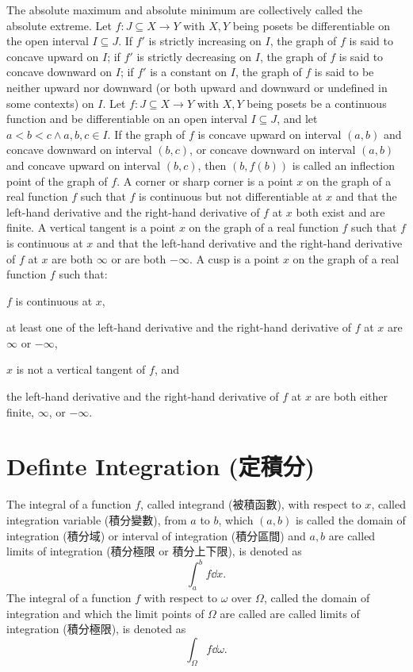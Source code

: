 \documentclass[a4paper,12pt]{report}
\begin{document}
The absolute maximum and absolute minimum are collectively called the absolute extreme.
Let $f\colon J\subseteq X\to Y$ with $X,Y$ being posets be differentiable on the open interval $I\subseteq J$. If $f'$ is strictly increasing on $I$, the graph of $f$ is said to concave upward on $I$; if $f'$ is strictly decreasing on $I$, the graph of $f$ is said to concave downward on $I$; if $f'$ is a constant on $I$, the graph of $f$ is said to be neither upward nor downward (or both upward and downward or undefined in some contexts) on $I$.
Let $f\colon J\subseteq X\to Y$ with $X,Y$ being posets be a continuous function and be differentiable on an open interval $I\subseteq J$, and let $a<b<c\land a,b,c\in I$. If the graph of $f$ is concave upward on interval $(a,b)$ and concave downward on interval $(b,c)$, or concave downward on interval $(a,b)$ and concave upward on interval $(b,c)$, then $(b,f(b))$ is called an inflection point of the graph of $f$.
A corner or sharp corner is a point $x$ on the graph of a real function $f$ such that $f$ is continuous but not differentiable at $x$ and that the left-hand derivative and the right-hand derivative of $f$ at $x$ both exist and are finite.
A vertical tangent is a point $x$ on the graph of a real function $f$ such that $f$ is continuous at $x$ and that the left-hand derivative and the right-hand derivative of $f$ at $x$ are both $\infty$ or are both $-\infty$.
A cusp is a point $x$ on the graph of a real function $f$ such that:
\bit
\item $f$ is continuous at $x$,
\item at least one of the left-hand derivative and the right-hand derivative of $f$ at $x$ are $\infty$ or $-\infty$,
\item $x$ is not a vertical tangent of $f$, and
\item the left-hand derivative and the right-hand derivative of $f$ at $x$ are both either finite, $\infty$, or $-\infty$.
\eit



\section{Definte Integration (定積分)}
The integral of a function $f$, called integrand (被積函數), with respect to $x$, called integration variable (積分變數), from $a$ to $b$, which $(a,b)$ is called the domain of integration (積分域) or interval of integration (積分區間) and $a,b$ are called limits of integration (積分極限 or 積分上下限), is denoted as
\[\int_a^bf\dd{x}.\]
The integral of a function $f$ with respect to $\omega$ over $\Omega$, called the domain of integration and which the limit points of $\Omega$ are called are called limits of integration (積分極限), is denoted as
\[\int_{\Omega}f\dd{\omega}.\]
\end{document}
